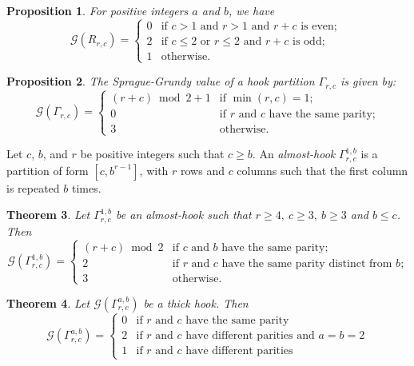 \documentclass[pdflatex,sn-mathphys-num]{sn-jnl}%
\theoremstyle{thmstyleone}%
\newtheorem{theorem}{Theorem}%
\newtheorem{proposition}[theorem]{Proposition}%
\theoremstyle{thmstyletwo}%
\theoremstyle{thmstylethree}%
\newcommand{\sg}{\mathcal{G}}
\begin{document}
\begin{proposition}
\label{lem:rectangle}
For positive integers $a$ and $b$, we have
$$\sg(R_{r,c}) = 
\begin{cases}
0 & \text{if } c > 1 \text{ and } r > 1 \text{ and } r+c \text{ is even; }\\
2 & \text{if } c \leq 2 \text{ or } r \leq 2 \text{ and } r+c \text{ is odd; } \\
1 & \text{otherwise.}
\end{cases}$$
\end{proposition}

\begin{proposition}
\label{lem:hook}
The Sprague-Grundy value of a hook partition $\Gamma_{r,c}$ is given by:
$$\sg(\Gamma_{r,c}) = 
\begin{cases}
(r+c) \bmod 2 + 1 & \text{if } \min(r,c) = 1; \\
0 & \text{if $r$ and $c$ have the same parity;} \\
3 & \text{otherwise.}
\end{cases}$$ 
\end{proposition}
%
Let $c$, $b$, and $r$ be positive integers such that $c \geq b$. An \emph{almost-hook}  $\Gamma_{r,c}^{1,b}$  is a partition of form $[c,b^{r-1}]$, with $r$ rows and $c$ columns such that the first column is repeated $b$ times.




\begin{theorem}
\label{thm:almost-hook}  
Let $\Gamma_{r,c}^{1,b}$ be an almost-hook such that 
$r \geq 4, \  c \geq 3, \ b \geq 3$ and $b \leq c$. 
Then 
$$\sg \left(\Gamma_{r,c}^{1,b} \right) = 
\begin{cases}
(r+c) \bmod 2 & \text{if $c$ and $b$ have the same parity;}\\
2 & \text{if $r$ and $c$ have the same parity distinct from $b$;} \\
3 & \text{otherwise.}
\end{cases}$$
\end{theorem}

\begin{theorem}
\label{thm:thick-hook}
Let $\sg\left(\Gamma_{r,c}^{a,b}\right)$ be a thick hook. Then
$$\sg\left(\Gamma_{r,c}^{a,b}\right) = 
\begin{cases}
0 & \text{if $r$ and $c$ have the same parity} \\
2 & \text{if $r$ and $c$ have different parities and $a = b = 2$} \\
1 & \text{if $r$ and $c$ have different parities} 

\end{cases}$$
\end{theorem}
\end{document}
